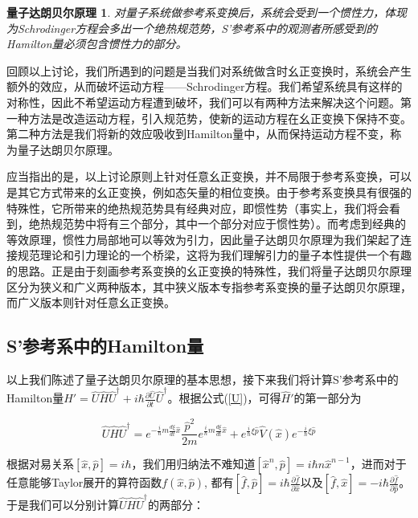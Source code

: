 \documentclass[a4paper]{article}
\newtheorem*{D'Alembert}{量子达朗贝尔原理}
\begin{document}
        \begin{D'Alembert}
            对量子系统做参考系变换后，系统会受到一个惯性力，体现为Schrodinger方程会多出一个绝热规范势，S'参考系中的观测者所感受到的Hamilton量必须包含惯性力的部分。
        \end{D'Alembert}

        回顾以上讨论，我们所遇到的问题是当我们对系统做含时幺正变换时，系统会产生额外的效应，从而破坏运动方程——Schrodinger方程。我们希望系统具有这样的对称性，因此不希望运动方程遭到破坏，我们可以有两种方法来解决这个问题。第一种方法是改造运动方程，引入规范势，使新的运动方程在幺正变换下保持不变。第二种方法是我们将新的效应吸收到Hamilton量中，从而保持运动方程不变，称为量子达朗贝尔原理。

        应当指出的是，以上讨论原则上针对任意幺正变换，并不局限于参考系变换，可以是其它方式带来的幺正变换，例如态矢量的相位变换。由于参考系变换具有很强的特殊性，它所带来的绝热规范势具有经典对应，即惯性势（事实上，我们将会看到，绝热规范势中将有三个部分，其中一个部分对应于惯性势）。而考虑到经典的等效原理，惯性力局部地可以等效为引力，因此量子达朗贝尔原理为我们架起了连接规范理论和引力理论的一个桥梁，这将为我们理解引力的量子本性提供一个有趣的思路。正是由于刻画参考系变换的幺正变换的特殊性，我们将量子达朗贝尔原理区分为狭义和广义两种版本，其中狭义版本专指参考系变换的量子达朗贝尔原理，而广义版本则针对任意幺正变换。


    \subsection{S'参考系中的Hamilton量}

        以上我们陈述了量子达朗贝尔原理的基本思想，接下来我们将计算S'参考系中的Hamilton量$\hat{H}'=\hat{U}\hat{H}\hat{U}^\dagger+i\hbar\frac{\partial\hat{U}}{\partial t}\hat{U}^\dagger$。根据公式(\ref{U})，可得$\hat{H}'$的第一部分为

        \begin{equation}
            \hat{U}\hat{H}\hat{U}^\dagger = e^{-\frac{i}{\hbar}m\frac{d\xi}{dt}\hat{x}}\frac{\hat{p}^2}{2m}e^{\frac{i}{\hbar}m\frac{d\xi}{dt}\hat{x}} + e^{\frac{i}{\hbar}\xi\hat{p}}\hat{V}(\hat{x})e^{-\frac{i}{\hbar}\xi\hat{p}}
        \end{equation}

        根据对易关系$[\hat{x},\hat{p}]=i\hbar$，我们用归纳法不难知道$[\hat{x}^n,\hat{p}]=i\hbar n\hat{x}^{n-1}$，进而对于任意能够Taylor展开的算符函数$f(\hat{x},\hat{p})$, 都有$[\hat{f}, \hat{p}]=i\hbar\frac{\partial\hat{f}}{\partial\hat{x}}$以及$[\hat{f}, \hat{x}]=-i\hbar\frac{\partial\hat{f}}{\partial\hat{p}}$。 于是我们可以分别计算$\hat{U}\hat{H}\hat{U}^\dagger$的两部分：
\end{document}
